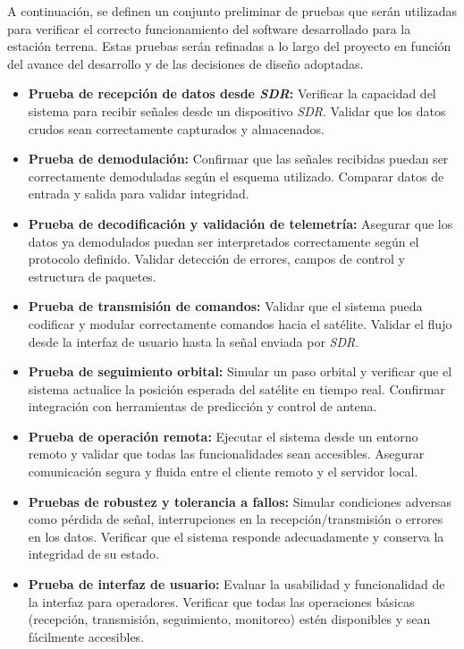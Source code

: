 A continuación, se definen un conjunto preliminar de pruebas que serán utilizadas para verificar el correcto funcionamiento del software desarrollado para la estación terrena. Estas pruebas serán refinadas a lo largo del proyecto en función del avance del desarrollo y de las decisiones de diseño adoptadas.

\begin{itemize}
    \item \textbf{Prueba de recepción de datos desde \textit{SDR}:} Verificar la capacidad del sistema para recibir señales desde un dispositivo \textit{SDR}. Validar que los datos crudos sean correctamente capturados y almacenados.

    \item \textbf{Prueba de demodulación:} Confirmar que las señales recibidas puedan ser correctamente demoduladas según el esquema utilizado. Comparar datos de entrada y salida para validar integridad.

    \item \textbf{Prueba de decodificación y validación de telemetría:} Asegurar que los datos ya demodulados puedan ser interpretados correctamente según el protocolo definido. Validar detección de errores, campos de control y estructura de paquetes.

    \item \textbf{Prueba de transmisión de comandos:} Validar que el sistema pueda codificar y modular correctamente comandos hacia el satélite. Validar el flujo desde la interfaz de usuario hasta la señal enviada por \textit{SDR}.

    \item \textbf{Prueba de seguimiento orbital:} Simular un paso orbital y verificar que el sistema actualice la posición esperada del satélite en tiempo real. Confirmar integración con herramientas de predicción y control de antena.

    \item \textbf{Prueba de operación remota:} Ejecutar el sistema desde un entorno remoto y validar que todas las funcionalidades sean accesibles. Asegurar comunicación segura y fluida entre el cliente remoto y el servidor local.
    
    \item \textbf{Pruebas de robustez y tolerancia a fallos:} Simular condiciones adversas como pérdida de señal, interrupciones en la recepción/transmisión o errores en los datos. Verificar que el sistema responde adecuadamente y conserva la integridad de su estado.
    
    \item \textbf{Prueba de interfaz de usuario:} Evaluar la usabilidad y funcionalidad de la interfaz para operadores. Verificar que todas las operaciones básicas (recepción, transmisión, seguimiento, monitoreo) estén disponibles y sean fácilmente accesibles.
\end{itemize}